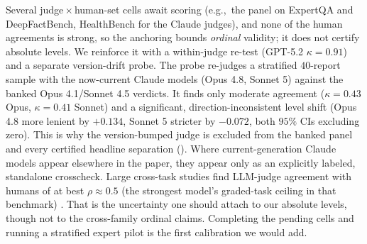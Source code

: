 \documentclass[11pt]{article}
\newcommand{\eg}{e.g.,\ }
\begin{document}
Several judge\,$\times$\,human-set cells await scoring (\eg the panel on ExpertQA
and DeepFactBench, HealthBench for the Claude judges), and none of the human agreements is strong,
so the anchoring bounds \emph{ordinal} validity; it does not certify absolute levels. We reinforce
it with a within-judge re-test (GPT-5.2 $\kappa=0.91$) and a separate version-drift probe. The probe re-judges
a stratified $40$-report sample with the now-current Claude models (Opus 4.8, Sonnet 5) against the
banked Opus 4.1/Sonnet 4.5 verdicts. It finds only moderate agreement ($\kappa=0.43$ Opus, $\kappa=0.41$
Sonnet) and a significant, direction-inconsistent level shift (Opus 4.8 more lenient by $+0.134$,
Sonnet 5 stricter by $-0.072$, both $95\%$ CIs excluding zero). This is why the version-bumped
judge is excluded from the banked panel and every certified headline separation
(). Where current-generation Claude models appear elsewhere
in the paper, they appear only as an explicitly labeled, standalone crosscheck. Large cross-task
studies find LLM-judge agreement with humans of at best $\rho\approx0.5$ (the strongest model's
graded-task ceiling in that benchmark) \citep{bavaresco2025llms_vs_humans}. That is the uncertainty
one should attach to our absolute levels, though not to the cross-family ordinal claims. Completing
the pending cells and running a stratified expert pilot is the first calibration we would add.
\end{document}
